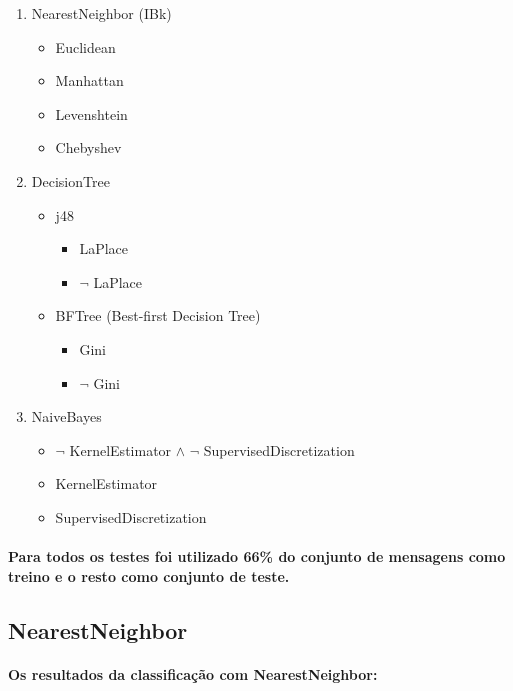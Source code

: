 \documentclass[a4paper,10pt]{article}
\theoremstyle{plain}
\begin{document}
\begin{enumerate}
  \item NearestNeighbor (IBk)
    \begin{itemize}
      \item Euclidean
      \item Manhattan
      \item Levenshtein
      \item Chebyshev
    \end{itemize}
  \item DecisionTree
    \begin{itemize}
      \item j48
        \begin{itemize}
          \item LaPlace
          \item $\neg$ LaPlace
        \end{itemize}
      \item BFTree (Best-first Decision Tree)
        \begin{itemize}
          \item Gini
          \item $\neg$ Gini
        \end{itemize}
    \end{itemize}
  \item NaiveBayes
    \begin{itemize}
      \item $\neg$ KernelEstimator $\land$ $\neg$ SupervisedDiscretization
      \item KernelEstimator
      \item SupervisedDiscretization
    \end{itemize}
\end{enumerate}

\paragraph{
  Para todos os testes foi utilizado 66\% do conjunto de mensagens como treino e o resto como
  conjunto de teste.
}

\subsection{NearestNeighbor}

\paragraph{
  Os resultados da classificação com NearestNeighbor:
}
\end{document}
